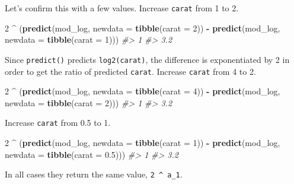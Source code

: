 \documentclass[]{book}
\newenvironment{Shaded}{\begin{snugshade}}{\end{snugshade}}
\newcommand{\CommentTok}[1]{\textcolor[rgb]{0.56,0.35,0.01}{\textit{#1}}}
\newcommand{\DataTypeTok}[1]{\textcolor[rgb]{0.13,0.29,0.53}{#1}}
\newcommand{\DecValTok}[1]{\textcolor[rgb]{0.00,0.00,0.81}{#1}}
\newcommand{\FloatTok}[1]{\textcolor[rgb]{0.00,0.00,0.81}{#1}}
\newcommand{\KeywordTok}[1]{\textcolor[rgb]{0.13,0.29,0.53}{\textbf{#1}}}
\newcommand{\NormalTok}[1]{#1}
\newcommand{\OperatorTok}[1]{\textcolor[rgb]{0.81,0.36,0.00}{\textbf{#1}}}
\newcommand{\StringTok}[1]{\textcolor[rgb]{0.31,0.60,0.02}{#1}}
\theoremstyle{plain}
\theoremstyle{remark}
\begin{document}
Let's confirm this with a few values.
Increase \texttt{carat} from 1 to 2.

\begin{Shaded}
\begin{Highlighting}[]
\DecValTok{2} \OperatorTok{^}\StringTok{ }\NormalTok{(}\KeywordTok{predict}\NormalTok{(mod_log, }\DataTypeTok{newdata =} \KeywordTok{tibble}\NormalTok{(}\DataTypeTok{carat =} \DecValTok{2}\NormalTok{)) }\OperatorTok{-}
\StringTok{  }\KeywordTok{predict}\NormalTok{(mod_log, }\DataTypeTok{newdata =} \KeywordTok{tibble}\NormalTok{(}\DataTypeTok{carat =} \DecValTok{1}\NormalTok{)))}
\CommentTok{#>   1 }
\CommentTok{#> 3.2}
\end{Highlighting}
\end{Shaded}

Since \texttt{predict()} predicts \texttt{log2(carat)}, the difference is exponentiated by 2 in order to get the ratio of predicted \texttt{carat}.
Increase \texttt{carat} from 4 to 2.

\begin{Shaded}
\begin{Highlighting}[]
\DecValTok{2} \OperatorTok{^}\StringTok{ }\NormalTok{(}\KeywordTok{predict}\NormalTok{(mod_log, }\DataTypeTok{newdata =} \KeywordTok{tibble}\NormalTok{(}\DataTypeTok{carat =} \DecValTok{4}\NormalTok{)) }\OperatorTok{-}
\StringTok{  }\KeywordTok{predict}\NormalTok{(mod_log, }\DataTypeTok{newdata =} \KeywordTok{tibble}\NormalTok{(}\DataTypeTok{carat =} \DecValTok{2}\NormalTok{)))}
\CommentTok{#>   1 }
\CommentTok{#> 3.2}
\end{Highlighting}
\end{Shaded}

Increase \texttt{carat} from 0.5 to 1.

\begin{Shaded}
\begin{Highlighting}[]
\DecValTok{2} \OperatorTok{^}\StringTok{ }\NormalTok{(}\KeywordTok{predict}\NormalTok{(mod_log, }\DataTypeTok{newdata =} \KeywordTok{tibble}\NormalTok{(}\DataTypeTok{carat =} \DecValTok{1}\NormalTok{)) }\OperatorTok{-}
\StringTok{  }\KeywordTok{predict}\NormalTok{(mod_log, }\DataTypeTok{newdata =} \KeywordTok{tibble}\NormalTok{(}\DataTypeTok{carat =} \FloatTok{0.5}\NormalTok{)))}
\CommentTok{#>   1 }
\CommentTok{#> 3.2}
\end{Highlighting}
\end{Shaded}

In all cases they return the same value, \texttt{2\ \^{}\ a\_1}.
\end{document}
